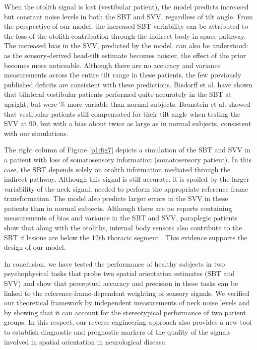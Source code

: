 When the otolith signal is lost (vestibular patient), the model predicts increased but constant noise levels in both the SBT and SVV, regardless of tilt angle. From the perspective of our model, the increased SBT variability can be attributed to the loss of the otolith contribution through the indirect body-in-space pathway. The increased bias in the SVV, predicted by the model, can also be understood: as the sensory-derived head-tilt estimate becomes noisier, the effect of the prior becomes more noticeable. Although there are no accuracy and variance measurements across the entire tilt range in these patients, the few previously published deficits are consistent with these predictions. Bisdorff et al. \citeyear{bisdorff1996} have shown that bilateral vestibular patients performed quite accurately in the SBT at upright, but were \% more variable than normal subjects. Bronstein et al. \citeyear{bronstein1996} showed that vestibular patients still compensated for their tilt angle when testing the SVV at 90\textdegree, but with a bias about twice as large as in normal subjects, consistent with our simulations. 

The right column of Figure \ref{p1:fig7} depicts a simulation of the SBT and SVV in a patient with loss of somatosensory information (somatosensory patient). In this case, the SBT depends solely on otolith information mediated through the indirect pathway. Although this signal is still accurate, it is spoiled by the larger variability of the neck signal, needed to perform the appropriate reference frame transformation. The model also predicts larger errors in the SVV in these patients than in normal subjects. Although there are no reports containing measurements of bias and variance in the SBT and SVV, paraplegic patients show that along with the otoliths, internal body sensors also contribute to the SBT if lesions are below the 12th thoracic segment \cite{mittelstaedt1997}. This evidence supports the design of our model. 

In conclusion, we have tested the performance of healthy subjects in two psychophysical tasks that probe two spatial orientation estimates (SBT and SVV) and show that perceptual accuracy and precision in these tasks can be linked to the reference-frame-dependent weighting of sensory signals. We verified our theoretical framework by independent measurements of neck noise levels and by showing that it can account for the stereotypical performance of two patient groups. In this respect, our reverse-engineering approach also provides a new tool to establish diagnostic and prognostic markers of the quality of the signals involved in spatial orientation in neurological disease. 

